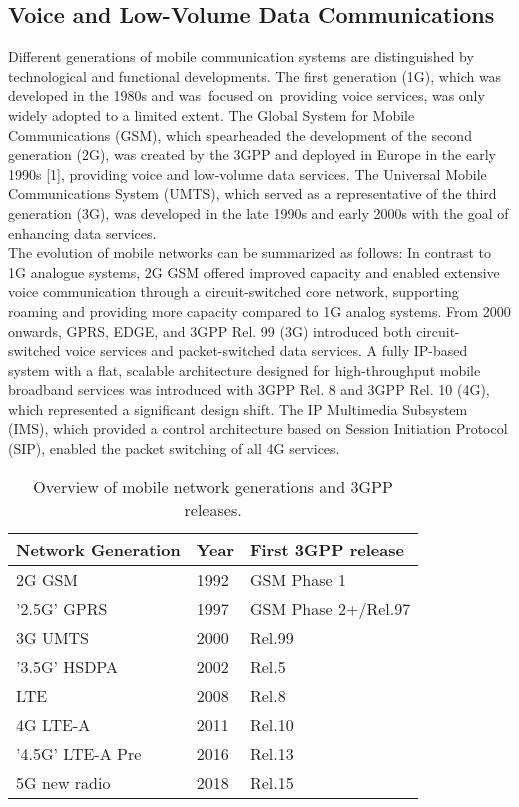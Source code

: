 \subsection{Voice and Low-Volume Data Communications}
Different generations of mobile communication systems are distinguished by technological and functional developments. The first generation (1G), which was developed in the 1980s and was focused on providing voice services, was only widely adopted to a limited extent. The Global System for Mobile Communications (GSM), which spearheaded the development of the second generation (2G), was created by the 3GPP and deployed in Europe in the early 1990s \cite{bibid}[1], providing voice and low-volume data services. The Universal Mobile Communications System (UMTS), which served as a representative of the third generation (3G), was developed in the late 1990s and early 2000s with the goal of enhancing data services.\\
The evolution of mobile networks can be summarized as follows: In contrast to 1G analogue systems, 2G GSM offered improved capacity and enabled extensive voice communication through a circuit-switched core network, supporting roaming and providing more capacity compared to 1G analog systems. From 2000 onwards, GPRS, EDGE, and 3GPP Rel. 99 (3G) introduced both circuit-switched voice services and packet-switched data services. A fully IP-based system with a flat, scalable architecture designed for high-throughput mobile broadband services was introduced with 3GPP Rel. 8 and 3GPP Rel. 10 (4G), which represented a significant design shift. The IP Multimedia Subsystem (IMS), which provided a control architecture based on Session Initiation Protocol (SIP), enabled the packet switching of all 4G services. 
\begin{table}[!h]
	\centering
	\caption{Overview of mobile network generations and 3GPP releases.}
	\label{tab: tab1}

	\begin{tabular}{|l|l|l|}
		\hline
		\textbf{Network Generation} & \textbf{Year} & \textbf{First 3GPP release} \\ \hline
		2G GSM                      & 1992          & GSM Phase 1                 \\ \hline
		'2.5G' GPRS                 & 1997          & GSM Phase 2+/Rel.97         \\ \hline
		3G UMTS                     & 2000          & Rel.99                      \\ \hline
		'3.5G' HSDPA                & 2002          & Rel.5                       \\ \hline
		LTE                         & 2008          & Rel.8                       \\ \hline
		4G LTE-A                    & 2011          & Rel.10                      \\ \hline
		'4.5G' LTE-A Pre            & 2016          & Rel.13                      \\ \hline
		5G new radio                & 2018          & Rel.15                      \\ \hline
	\end{tabular}
\end{table}
